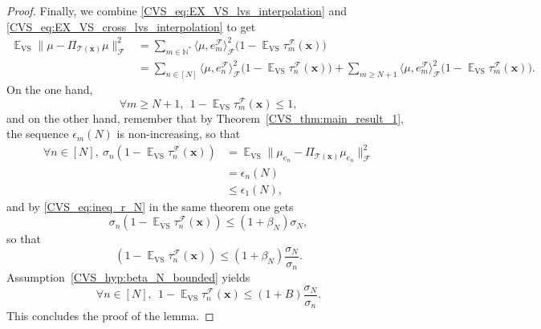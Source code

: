 \documentclass[twoside,11pt]{book}
\numberwithin{theorem}{chapter}
\numberwithin{definition}{chapter}
\numberwithin{proposition}{chapter}
\numberwithin{corollary}{chapter}
\numberwithin{example}{chapter}
\numberwithin{lemma}{chapter}
\numberwithin{assumption}{chapter}
\DeclareMathOperator{\VS}{\mathrm{VS}}
\DeclareMathOperator{\EX}{\mathbb{E}}
\DeclareMathOperator{\F}{\mathcal{F}}
\begin{document}
\begin{proof}
Finally, we combine \eqref{CVS_eq:EX_VS_lvs_interpolation} and \eqref{CVS_eq:EX_VS_cross_lvs_interpolation} to get
\begin{align}
\EX_{\VS}\|\mu - \Pi_{\mathcal{T}(\bm{x})} \mu\|_{\F}^{2} & = \sum\limits_{m \in \mathbb{N}^{*}} \langle \mu, e_{m}^{\F} \rangle_{\F}^{2}\bigg(1- \EX_{\VS}\tau_{m}^{\F}(\bm{x})\bigg) \nonumber\\
& = \sum\limits_{n \in [N]} \langle \mu, e_{n}^{\F} \rangle_{\F}^{2}\bigg(1- \EX_{\VS}\tau_{n}^{\F}(\bm{x})\bigg) + \sum\limits_{m \geq N+1} \langle \mu, e_{m}^{\F} \rangle_{\F}^{2}\bigg(1- \EX_{\VS}\tau_{m}^{\F}(\bm{x})\bigg).
\end{align}
On the one hand,
\begin{equation}
\forall m \geq N+1, \:\: 1- \EX_{\VS}\tau_{m}^{\F}(\bm{x}) \leq 1,
\end{equation}
and on the other hand, remember that by Theorem~\ref{CVS_thm:main_result_1}, the sequence $\epsilon_{m}(N)$ is non-increasing, so that
\begin{align}
\forall n \in [N], \: \sigma_{n} (1-\EX_{\VS} \tau_{n}^{\F}(\bm{x})) & = \EX_{\VS} \|\mu_{e_{n}} - \Pi_{\mathcal{T}(\bm{x})} \mu_{e_{n}}\|_{\F}^{2} \\
& = \epsilon_{n}(N) \\
& \leq \epsilon_{1}(N),
\end{align}
and by \eqref{CVS_eq:ineq_r_N} in the same theorem one gets
\begin{equation}
\sigma_{n} (1-\EX_{\VS} \tau_{n}^{\F}(\bm{x})) \leq (1+\beta_{N}) \sigma_{N},
\end{equation}
so that
\begin{equation}
 (1-\EX_{\VS} \tau_{n}^{\F}(\bm{x})) \leq (1+\beta_{N})\frac{ \sigma_{N}}{\sigma_{n}}.
\end{equation}
Assumption~\ref{CVS_hyp:beta_N_bounded} yields \
\begin{equation}
\forall n \in [N],\:\: 1- \EX_{\VS}\tau_{n}^{\F}(\bm{x}) \leq  (1+B) \frac{\sigma_{N}}{\sigma_{n}}.
\end{equation}
This concludes the proof of the lemma.
\end{proof}
\end{document}
